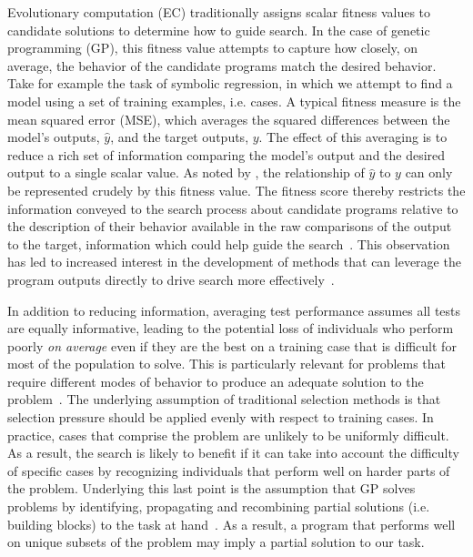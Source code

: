 \documentclass[twoside]{article}
\begin{document}
Evolutionary computation (EC) traditionally assigns scalar fitness values to candidate solutions to determine how to guide search. In the case of genetic programming (GP), this fitness value attempts to capture how closely, on average, the behavior of the candidate programs match the desired behavior. Take for example the task of symbolic regression, in which we attempt to find a model using a set of training examples, i.e. cases. A typical fitness measure is the mean squared error (MSE), which averages the squared differences between the model's outputs, $\hat{y}$, and the target outputs, $y$. The effect of this averaging is to reduce a rich set of information comparing the model's output and the desired output to a single scalar value. As noted by \cite{krawiec_behavioral_2016}, the relationship of $\hat{y}$ to $y$ can only be represented crudely by this fitness value. The fitness score thereby restricts the information conveyed to the search process about candidate programs relative to the description of their behavior available in the raw comparisons of the output to the target, information which could help guide the search~\citep{chrisgptp2015behavioral, krawiec_automatic_2015}. This observation has led to increased interest in the development of methods that can leverage the program outputs directly to drive search more effectively~\citep{vanneschi_survey_2014}.

In addition to reducing information, averaging test performance assumes all tests are equally informative, leading to the potential loss of individuals who perform poorly {\it on average} even if they are the best on a training case that is difficult for most of the population to solve. This is particularly relevant for problems that require different modes of behavior to produce an adequate solution to the problem~\citep{spector_assessment_2012}. The underlying assumption of traditional selection methods is that selection pressure should be applied evenly with respect to training cases. In practice, cases that comprise the problem are unlikely to be uniformly difficult. As a result, the search is likely to benefit if it can take into account the difficulty of specific cases by recognizing individuals that perform well on harder parts of the problem. Underlying this last point is the assumption that GP solves problems by identifying, propagating and recombining partial solutions (i.e. building blocks) to the task at hand~\citep{poli_schema_1998}. As a result, a program that performs well on unique subsets of the problem may imply a partial solution to our task. 
\end{document}
